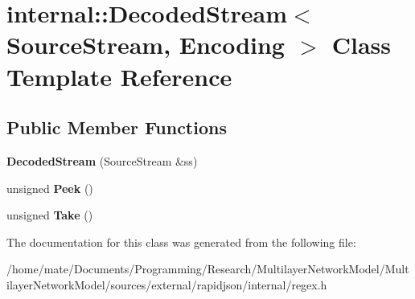 \hypertarget{classinternal_1_1DecodedStream}{}\section{internal\+:\+:Decoded\+Stream$<$ Source\+Stream, Encoding $>$ Class Template Reference}
\label{classinternal_1_1DecodedStream}
\subsection*{Public Member Functions}
\begin{DoxyCompactItemize}
\item 
{\bfseries Decoded\+Stream} (Source\+Stream \&ss)\hypertarget{classinternal_1_1DecodedStream_a45cf40c4e515be8aaa8cd020eaa67595}{}\label{classinternal_1_1DecodedStream_a45cf40c4e515be8aaa8cd020eaa67595}

\item 
unsigned {\bfseries Peek} ()\hypertarget{classinternal_1_1DecodedStream_ac78f2cbc03ae0d79a0fcfe6d56589d70}{}\label{classinternal_1_1DecodedStream_ac78f2cbc03ae0d79a0fcfe6d56589d70}

\item 
unsigned {\bfseries Take} ()\hypertarget{classinternal_1_1DecodedStream_a62b45969ce169bef1da0600490329857}{}\label{classinternal_1_1DecodedStream_a62b45969ce169bef1da0600490329857}

\end{DoxyCompactItemize}


The documentation for this class was generated from the following file\+:\begin{DoxyCompactItemize}
\item 
/home/mate/\+Documents/\+Programming/\+Research/\+Multilayer\+Network\+Model/\+Multilayer\+Network\+Model/sources/external/rapidjson/internal/regex.\+h\end{DoxyCompactItemize}
